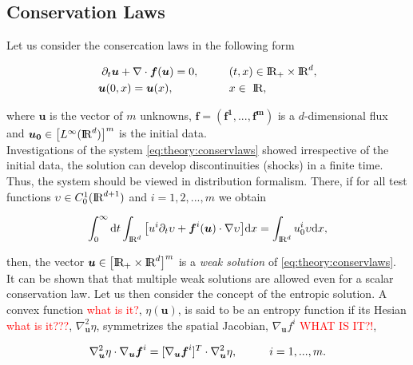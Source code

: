 \documentclass[11pt,a4paper,headinclude=true,DIV=14,BCOR=8mm,chapterprefix,listof=totoc,twoside,openright,abstracton]{scrbook}
\begin{document}
\subsection{Conservation Laws}

Let us consider the consercation laws in the following form

\begin{align}
    \partial_t\boldsymbol{u} + \nabla\cdot\boldsymbol{f}(\boldsymbol{u}) = 0, \hspace{10mm} &(t,x)\in \text{I\!R}_{+}\times\text{I\!R}^d , \\
    \boldsymbol{u}(0, x) = \boldsymbol{u}(x), \hspace{18mm} &x\in \text{ I\!R},
    \label{eq:theory:conservlaws}
\end{align}

where $\boldsymbol{u}$ is the vector of $m$ unknowns, $\boldsymbol{f}=(\boldsymbol{\boldsymbol{f}^1,...,\boldsymbol{f}^m})$ is a $d$-dimensional flux and $\boldsymbol{u_0}\in\big[L^{\infty}(\text{I\!R}^d)\big]^m$ is the initial data. \\

Investigations of the system \ref{eq:theory:conservlaws} showed irrespective of the initial data, the solution can develop discontinuities (shocks) in a finite time. Thus, the system should be viewed in distribution formalism. There, if for all test functions $\upsilon\in C_0 ^1 (\text{I\!R}^{d+1})$ and $i=1,2,...,m$  we obtain

\begin{equation}
    \int_{0}^{\infty}\text{d}t\int_{\text{I\!R}^d}\big[u^i \partial_t\upsilon + \boldsymbol{f}^i(\boldsymbol{u})\cdot\nabla\upsilon\big]\text{d}x = \int_{\text{I\!R}^d} u_0 ^i \upsilon \text{d}x,
\end{equation}

then, the vector $\boldsymbol{u}\in\big[\text{I\!R}_{+}\times\text{I\!R}^d\big]^m$ is a \textit{weak solution} of \ref{eq:theory:conservlaws}.\\

It can be shown that that multiple weak solutions are allowed even for a scalar conservation law. Let us then consider the concept of the entropic solution. A convex function \textcolor{red}{what is it?}, $\eta(\boldsymbol{u})$, is said to be an entropy function if its Hesian \textcolor{red}{what is it???}, $\nabla_{\boldsymbol{u}}^2\eta$, symmetrizes the spatial Jacobian, $\nabla_{\boldsymbol{u}}f^i$ \textcolor{red}{WHAT IS IT?!},

\begin{equation}
    \nabla_{\boldsymbol{u}}^2\eta\cdot\nabla_{\boldsymbol{u}}\boldsymbol{f}^i = [\nabla_{\boldsymbol{u}}\boldsymbol{f}^i]^{T}\cdot\nabla_{\boldsymbol{u}}^2\eta, \hspace{10mm} i = 1, ... , m.
\end{equation}
\end{document}
